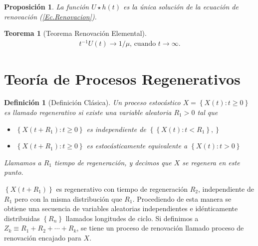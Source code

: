\documentclass{article}
\newtheorem{Def}{Definición}[section]
\newtheorem{Teo}{Teorema}[section]
\newtheorem{Prop}{Proposición}[section]
\numberwithin{equation}{section}
\begin{document}
\begin{Prop}
La funci\'on $U\star h\left(t\right)$ es la \'unica soluci\'on de la ecuaci\'on de renovaci\'on (\ref{Ec.Renovacion}).
\end{Prop}

\begin{Teo}[Teorema Renovaci\'on Elemental]
\begin{eqnarray*}
t^{-1}U\left(t\right)\rightarrow 1/\mu\textrm{,    cuando }t\rightarrow\infty.
\end{eqnarray*}
\end{Teo}


\section{Teor\'ia de Procesos Regenerativos}
\begin{Def}[Definici\'on Cl\'asica]
Un proceso estoc\'astico $X=\left\{X\left(t\right):t\geq0\right\}$ es llamado regenerativo si existe una variable aleatoria $R_{1}>0$ tal que
\begin{itemize}
\item[i)] $\left\{X\left(t+R_{1}\right):t\geq0\right\}$ es independiente de $\left\{\left\{X\left(t\right):t<R_{1}\right\},\right\}$
\item[ii)] $\left\{X\left(t+R_{1}\right):t\geq0\right\}$ es estoc\'asticamente equivalente a $\left\{X\left(t\right):t>0\right\}$
\end{itemize}

Llamamos a $R_{1}$ tiempo de regeneraci\'on, y decimos que $X$ se regenera en este punto.
\end{Def}

$\left\{X\left(t+R_{1}\right)\right\}$ es regenerativo con tiempo de regeneraci\'on $R_{2}$, independiente de $R_{1}$ pero con la misma distribuci\'on que $R_{1}$. Procediendo de esta manera se obtiene una secuencia de variables aleatorias independientes e id\'enticamente distribuidas $\left\{R_{n}\right\}$ llamados longitudes de ciclo. Si definimos a $Z_{k}\equiv R_{1}+R_{2}+\cdots+R_{k}$, se tiene un proceso de renovaci\'on llamado proceso de renovaci\'on encajado para $X$.
\end{document}
